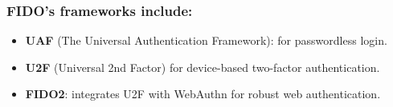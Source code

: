\subsubsection{FIDO's frameworks include:}
\begin{itemize}
    \item \textbf{UAF} (The Universal Authentication Framework): for passwordless login.
    \item \textbf{U2F} (Universal 2nd Factor) for device-based two-factor authentication.
    \item \textbf{FIDO2}: integrates U2F with WebAuthn for robust web authentication.
\end{itemize}























